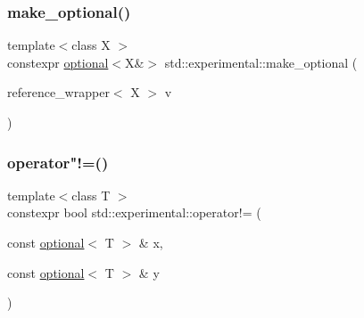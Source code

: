 \mbox{\label{namespacestd_1_1experimental_a0f7b286ddf3bb6c4e95580898dcde37b}} 
\subsubsection{\texorpdfstring{make\+\_\+optional()}{make\_optional()}\hspace{0.1cm}{\footnotesize\ttfamily [2/2]}}
{\footnotesize\ttfamily template$<$class X $>$ \\
constexpr \hyperlink{classstd_1_1experimental_1_1optional}{optional}$<$X\&$>$ std\+::experimental\+::make\+\_\+optional (\begin{DoxyParamCaption}\item[{reference\+\_\+wrapper$<$ X $>$}]{v }\end{DoxyParamCaption})}

\mbox{\label{namespacestd_1_1experimental_abf45cbc40acb4929dbf1caa3b31460d9}} 
\subsubsection{\texorpdfstring{operator"!=()}{operator!=()}\hspace{0.1cm}{\footnotesize\ttfamily [1/9]}}
{\footnotesize\ttfamily template$<$class T $>$ \\
constexpr bool std\+::experimental\+::operator!= (\begin{DoxyParamCaption}\item[{const \hyperlink{classstd_1_1experimental_1_1optional}{optional}$<$ T $>$ \&}]{x,  }\item[{const \hyperlink{classstd_1_1experimental_1_1optional}{optional}$<$ T $>$ \&}]{y }\end{DoxyParamCaption})}

\mbox{\label{namespacestd_1_1experimental_a768f39fe88fcf07a351e8f45d6dfb1b3}} 
